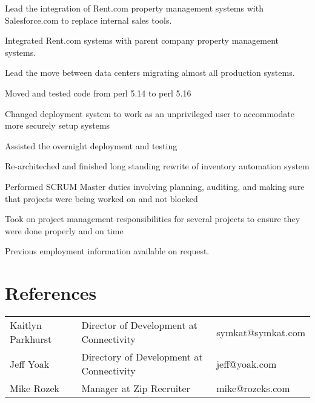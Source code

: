 \documentclass[table,tmargin=1in,bmargin=1in,letterpaper]{resume}
\begin{document}
\begin{compactitem}
\item Lead the integration of Rent.com property management systems with Salesforce.com to replace internal sales tools.
\item Integrated Rent.com systems with parent company property management systems.
\item Lead the move between data centers migrating almost all production systems.
  \begin{compactitem}
  \item Moved and tested code from perl 5.14 to perl 5.16
  \item Changed deployment system to work as an unprivileged user to accommodate more securely setup systems
  \item Assisted the overnight deployment and testing
  \end{compactitem}
\item Re-architeched and finished long standing rewrite of inventory automation system
\item Performed SCRUM Master duties involving planning, auditing, and making sure that projects were being worked on and not blocked
\item Took on project management responsibilities for several projects to ensure they were done properly and on time
\end{compactitem}

Previous employment information available on request.


\section{References}
\begin{tabular}{lll}
\rowcolor{white} Kaitlyn Parkhurst & Director of Development at Connectivity & symkat@symkat.com \\
\rowcolor{lightgray} Jeff Yoak & Directory of Development at Connectivity & jeff@yoak.com \\
\rowcolor{white} Mike Rozek & Manager at Zip Recruiter & mike@rozeks.com
\end{tabular}
\end{document}
